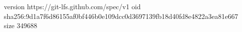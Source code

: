 version https://git-lfs.github.com/spec/v1
oid sha256:9d1a7f6d86155af0bf446b0e109dcc0d3697139fb18d40fd8e4822a3ea81e667
size 349688
